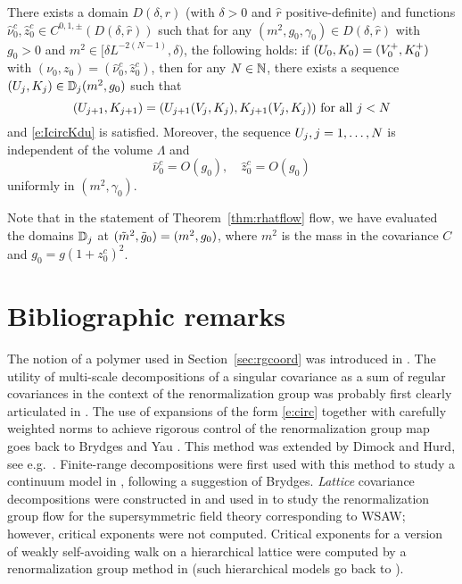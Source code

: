 \begin{theorem}
\label{thm:rhatflow}
There exists a domain $D(\delta, \hat r)$ (with $\delta > 0$ and $\hat r$
positive-definite) and functions $\hat\nu_0^c, \hat z_0^c \in C^{0,1,\pm}(D(\delta, \hat r))$
such that for any $(m^2, g_0, \gamma_0) \in D(\delta, \hat r)$
with $g_0 > 0$ and $m^2 \in [\delta L^{-2 (N - 1)}, \delta)$, the following holds:
if $(U_0, K_0) = (V^+_0, K^+_0)$ with $(\nu_0, z_0) = (\hat\nu_0^c, \hat z_0^c)$,
then for any $N \in {\mathbb N}$, there exists a sequence $(U_j, K_j) \in \mathbb{D}_j(m^2, g_0)$ such that
\begin{equation}
\label{e:VjKjDj-hat}
(U_{j+1},K_{j+1})
	=
(U_{j+1}(V_j, K_j), K_{j+1}(V_j, K_j)) \text{ for all } j < N
\end{equation}
and \eqref{e:IcircKdu} is satisfied.
Moreover, the sequence $U_j, j = 1, \ldots, N$ is independent of the volume $\Lambda$ and
\begin{equation}
\label{e:hat-est}
\hat\nu_0^c = O(g_0),
\quad
\hat z_0^c = O(g_0)
\end{equation}
uniformly in $(m^2, \gamma_0)$.
\end{theorem}

Note that in the statement of Theorem~\ref{thm:rhatflow} flow, we have evaluated
the domains $\mathbb{D}_j$ at $(\tilde{m}^2, \tilde{g}_0) = (m^2, g_0)$, where $m^2$ is the
mass in the covariance $C$ and $g_0 = g (1 + z_0^c)^2$.


\section{Bibliographic remarks}

The notion of a polymer used in Section~\ref{sec:rgcoord} was introduced in
\cite{GK71}. The utility of multi-scale decompositions of a singular covariance
as a sum of regular covariances in the context of the renormalization group was
probably first clearly articulated in \cite{BCGNOPS78}. The use of expansions of
the form \eqref{e:circ} together with carefully weighted norms to achieve rigorous
control of the renormalization group map goes back to Brydges and Yau \cite{BY90}.
This method was extended by Dimock and Hurd, see e.g.\ \cite{DH92,DH00}. Finite-range
decompositions were first used with this method to study a continuum model in
\cite{MS00}, following a suggestion of Brydges. \emph{Lattice} covariance
decompositions were constructed in \cite{BGM04} and used in \cite{MS08} to study
the renormalization group flow for the supersymmetric field theory corresponding
to WSAW; however, critical exponents were not computed. Critical exponents for
a version of weakly self-avoiding walk on a hierarchical lattice were computed
by a renormalization group method in \cite{BI03c,BI03d} (such hierarchical models
go back to \cite{Dyso69}).
